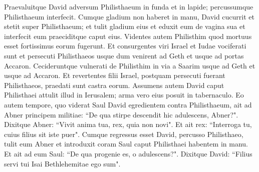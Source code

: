 \begin{biblechapter}
\verse Praevaluitque David adversum Philisthaeum in funda et in lapide; percussumque Philisthaeum interfecit. Cumque gladium non haberet in manu, David 
\verse cucurrit et stetit super Philisthaeum; et tulit gladium eius et eduxit eum de vagina sua et interfecit eum praeciditque caput eius. Videntes autem Philisthim quod mortuus esset fortissimus eorum fugerunt. 
\verse Et consurgentes viri Israel et Iudae vociferati sunt et persecuti Philisthaeos usque dum venirent ad Geth et usque ad portas Accaron. Cecideruntque vulnerati de Philisthim in via a Saarim usque ad Geth et usque ad Accaron. 
\verse Et revertentes filii Israel, postquam persecuti fuerant Philisthaeos, praedati sunt castra eorum. 
\verse Assumens autem David caput Philisthaei attulit illud in Ierusalem; arma vero eius posuit in tabernaculo. 
\verse Eo autem tempore, quo viderat Saul David egredientem contra Philisthaeum, ait ad Abner principem militiae: “De qua stirpe descendit hic adulescens, Abner?". Dixitque Abner: “Vivit anima tua, rex, quia non novi". 
\verse Et ait rex: “Interroga tu, cuius filius sit iste puer". 
\verse Cumque regressus esset David, percusso Philisthaeo, tulit eum Abner et introduxit coram Saul caput Philisthaei habentem in manu. 
\verse Et ait ad eum Saul: “De qua progenie es, o adulescens?". Dixitque David: “Filius servi tui Isai Bethlehemitae ego sum". 
\end{biblechapter}

